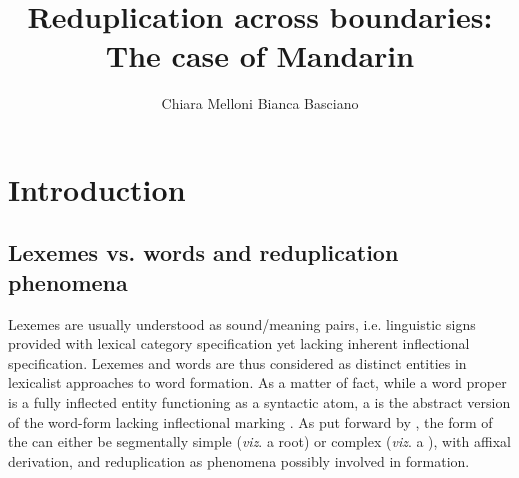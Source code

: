 \documentclass[output=paper]{langsci/langscibook}
\title{Reduplication across boundaries: The case of Mandarin}
\author{Chiara Melloni\affiliation{University of Verona} \lastand Bianca Basciano\affiliation{Ca' Foscari University of Venice}}
\begin{document}

\section{Introduction}

\subsection{Lexemes vs. words and reduplication phenomena}

Lexemes are usually understood as sound/meaning pairs, i.e. linguistic
signs provided with lexical category specification yet lacking inherent
inflectional specification. Lexemes and words are thus considered as
distinct entities in lexicalist approaches to word formation. As a
matter of fact, while a word proper is a fully inflected entity
functioning as a syntactic atom, a  is the abstract version of the
word-form lacking inflectional marking %
\citep{Fradin03b}%
%
. As
put forward by %
\citet{Fradin03b}%
%
, the form of the  can
either be segmentally simple (\emph{viz}. a root) or complex
(\emph{viz}. a ), with affixal derivation,  and
reduplication as phenomena possibly involved in  formation.
\end{document}
